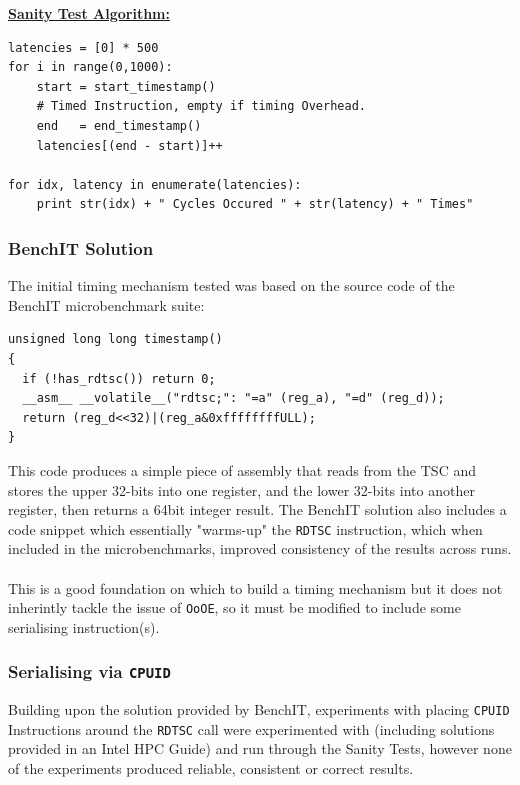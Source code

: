 \documentclass[bsc,frontabs,twoside,singlespacing,parskip,deptreport]{infthesis}     %
\begin{document}
\underline{\textbf{Sanity Test Algorithm:}}\label{sanity-test-algo} \\
\begin{verbatim}
latencies = [0] * 500
for i in range(0,1000):
    start = start_timestamp()
    # Timed Instruction, empty if timing Overhead.
    end   = end_timestamp()
    latencies[(end - start)]++

for idx, latency in enumerate(latencies):
    print str(idx) + " Cycles Occured " + str(latency) + " Times"
\end{verbatim}


\subsubsection{BenchIT Solution\cite{benchit_src}}\label{benchit-disc}
The initial timing mechanism tested was based on the source code of the BenchIT microbenchmark suite:
\begin{verbatim}
unsigned long long timestamp()
{
  if (!has_rdtsc()) return 0;
  __asm__ __volatile__("rdtsc;": "=a" (reg_a), "=d" (reg_d));
  return (reg_d<<32)|(reg_a&0xffffffffULL);
}
\end{verbatim}
This code produces a simple piece of assembly that reads from the TSC and stores the upper 32-bits into one register, and the lower 32-bits into another register, then returns a 64bit integer result. The BenchIT solution also includes a code snippet which essentially "warms-up" the \texttt{RDTSC} instruction, which when included in the microbenchmarks, improved consistency of the results across runs.\\
\\
This is a good foundation on which to build a timing mechanism but it does not inherintly tackle the issue of \texttt{OoOE}, so it must be modified to include some serialising instruction(s).

\subsubsection{Serialising via \texttt{CPUID}}
Building upon the solution provided by BenchIT, experiments with placing \texttt{CPUID} Instructions around the \texttt{RDTSC} call were experimented with (including solutions provided in an Intel HPC Guide\cite{intel_hpc_guide}) and run through the Sanity Tests, however none of the experiments produced reliable, consistent or correct results.
\end{document}

